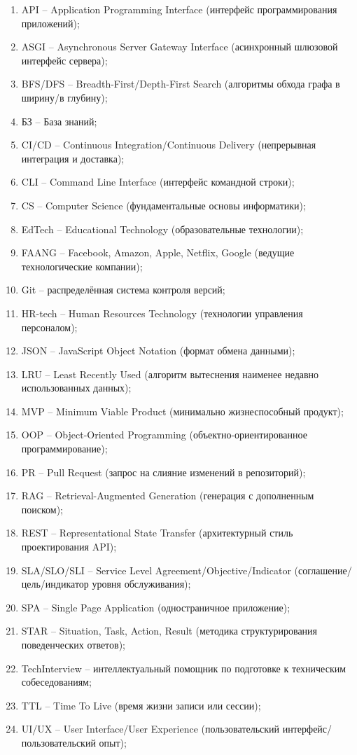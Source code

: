 \label{sec:reduction}
\begin{enumerate}
    \item API -- Application Programming Interface (интерфейс программирования приложений);
    \item ASGI -- Asynchronous Server Gateway Interface (асинхронный шлюзовой интерфейс сервера);
    \item BFS/DFS -- Breadth-First/Depth-First Search (алгоритмы обхода графа в ширину/в глубину);
    \item БЗ -- База знаний;
    \item CI/CD -- Continuous Integration/Continuous Delivery (непрерывная интеграция и доставка);
    \item CLI -- Command Line Interface (интерфейс командной строки);
    \item CS -- Computer Science (фундаментальные основы информатики);
    \item EdTech -- Educational Technology (образовательные технологии);
    \item FAANG -- Facebook, Amazon, Apple, Netflix, Google (ведущие технологические компании);
    \item Git -- распределённая система контроля версий;
    \item HR-tech -- Human Resources Technology (технологии управления персоналом);
    \item JSON -- JavaScript Object Notation (формат обмена данными);
    \item LRU -- Least Recently Used (алгоритм вытеснения наименее недавно использованных данных);
    \item MVP -- Minimum Viable Product (минимально жизнеспособный продукт);
    \item OOP -- Object-Oriented Programming (объектно-ориентированное программирование);
    \item PR -- Pull Request (запрос на слияние изменений в репозиторий);
    \item RAG -- Retrieval-Augmented Generation (генерация с дополненным поиском);
    \item REST -- Representational State Transfer (архитектурный стиль проектирования API);
    \item SLA/SLO/SLI -- Service Level Agreement/Objective/Indicator (соглашение/цель/индикатор уровня обслуживания);
    \item SPA -- Single Page Application (одностраничное приложение);
    \item STAR -- Situation, Task, Action, Result (методика структурирования поведенческих ответов);
    \item TechInterview -- интеллектуальный помощник по подготовке к техническим собеседованиям;
    \item TTL -- Time To Live (время жизни записи или сессии);
    \item UI/UX -- User Interface/User Experience (пользовательский интерфейс/пользовательский опыт);
\end{enumerate}


